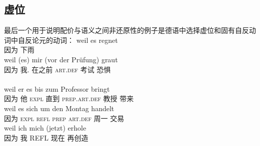 \begin{exe}
\begin{xlist}[iv.]
\begin{exe}
\begin{xlist}[iv.]
\subsection{虚位}
\label{sec-expletives}

最后一个用于说明配价与语义之间非还原性的例子是德语中选择虚位和固有自反动词中自反论元的动词：
\eal
\ex 
\gll weil es regnet\\
     因为 \expl{} 下雨\\
\ex 
\gll weil (es) mir (vor der Prüfung) graut\\
     因为 \expl{} 我.\dat{} 在之前 \textsc{art}.\textsc{def} 考试 恐惧\\\\
\ex\label{ex-zum-Professor}
\gll weil er es bis zum Professor bringt\\
     因为 他 \textsc{expl} 直到 \textsc{prep}.\textsc{art}.\textsc{def} 教授 带来\\
\ex 
\gll weil es sich um den Montag handelt\\
     因为 \textsc{expl} \textsc{refl} \textsc{prep} \textsc{art}.\textsc{def} 周一 交易\\
\ex 
\gll weil ich mich (jetzt) erhole\\
     因为 我 REFL 现在 再创造\\

\end{xlist}
\end{exe}
\end{xlist}
\end{exe}
